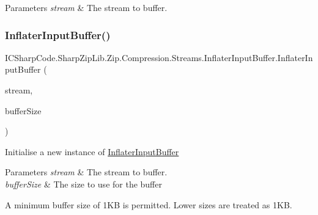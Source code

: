 \begin{DoxyParams}{Parameters}
{\em stream} & The stream to buffer.\\
\hline
\end{DoxyParams}
\mbox{\label{class_i_c_sharp_code_1_1_sharp_zip_lib_1_1_zip_1_1_compression_1_1_streams_1_1_inflater_input_buffer_acb49a5794ba884055d505b84659b583d}} 
\subsubsection{\texorpdfstring{Inflater\+Input\+Buffer()}{InflaterInputBuffer()}\hspace{0.1cm}{\footnotesize\ttfamily [4/4]}}
{\footnotesize\ttfamily I\+C\+Sharp\+Code.\+Sharp\+Zip\+Lib.\+Zip.\+Compression.\+Streams.\+Inflater\+Input\+Buffer.\+Inflater\+Input\+Buffer (\begin{DoxyParamCaption}\item[{Stream}]{stream,  }\item[{int}]{buffer\+Size }\end{DoxyParamCaption})\hspace{0.3cm}{\ttfamily [inline]}}



Initialise a new instance of \hyperlink{class_i_c_sharp_code_1_1_sharp_zip_lib_1_1_zip_1_1_compression_1_1_streams_1_1_inflater_input_buffer}{Inflater\+Input\+Buffer} 


\begin{DoxyParams}{Parameters}
{\em stream} & The stream to buffer.\\
\hline
{\em buffer\+Size} & The size to use for the buffer\\
\hline
\end{DoxyParams}


A minimum buffer size of 1\+KB is permitted. Lower sizes are treated as 1\+KB.

